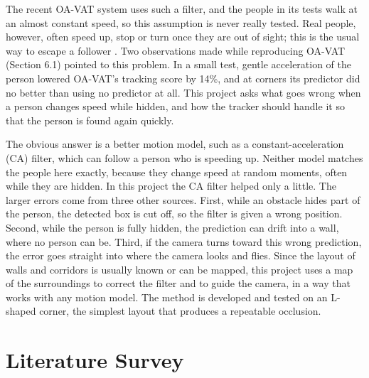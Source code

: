 \documentclass[12pt,a4paper]{article}
\begin{document}
The recent OA-VAT system \cite{r3} uses such a filter, and the people in its tests walk at an almost constant speed, so this assumption is never really tested.
Real people, however, often speed up, stop or turn once they are out of sight; this is the usual way to escape a follower \cite{r4}.
Two observations made while reproducing OA-VAT (Section 6.1) pointed to this problem.
In a small test, gentle acceleration of the person lowered OA-VAT's tracking score by 14\%, and at corners its predictor did no better than using no predictor at all.
This project asks what goes wrong when a person changes speed while hidden, and how the tracker should handle it so that the person is found again quickly.

The obvious answer is a better motion model, such as a constant-acceleration (CA) filter, which can follow a person who is speeding up.
Neither model matches the people here exactly, because they change speed at random moments, often while they are hidden.
In this project the CA filter helped only a little.
The larger errors come from three other sources.
First, while an obstacle hides part of the person, the detected box is cut off, so the filter is given a wrong position.
Second, while the person is fully hidden, the prediction can drift into a wall, where no person can be.
Third, if the camera turns toward this wrong prediction, the error goes straight into where the camera looks and flies.
Since the layout of walls and corridors is usually known or can be mapped, this project uses a map of the surroundings to correct the filter and to guide the camera, in a way that works with any motion model.
The method is developed and tested on an L-shaped corner, the simplest layout that produces a repeatable occlusion.

\section{Literature Survey}
\end{document}
